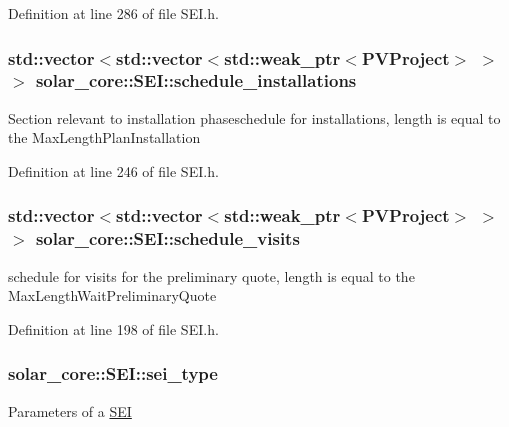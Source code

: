 Definition at line 286 of file S\+E\+I.\+h.

\hypertarget{classsolar__core_1_1_s_e_i_aacda4fae2c17d58672b60eba9c8cdc63}{}
\subsubsection[{schedule\+\_\+installations}]{\setlength{\rightskip}{0pt plus 5cm}std\+::vector$<$std\+::vector$<$std\+::weak\+\_\+ptr$<${\bf P\+V\+Project}$>$ $>$ $>$ solar\+\_\+core\+::\+S\+E\+I\+::schedule\+\_\+installations\hspace{0.3cm}{\ttfamily [protected]}}\label{classsolar__core_1_1_s_e_i_aacda4fae2c17d58672b60eba9c8cdc63}
Section relevant to installation phaseschedule for installations, length is equal to the Max\+Length\+Plan\+Installation 

Definition at line 246 of file S\+E\+I.\+h.

\hypertarget{classsolar__core_1_1_s_e_i_a8729d1aaf89da5d7d8b52761b65c881c}{}
\subsubsection[{schedule\+\_\+visits}]{\setlength{\rightskip}{0pt plus 5cm}std\+::vector$<$std\+::vector$<$std\+::weak\+\_\+ptr$<${\bf P\+V\+Project}$>$ $>$ $>$ solar\+\_\+core\+::\+S\+E\+I\+::schedule\+\_\+visits\hspace{0.3cm}{\ttfamily [protected]}}\label{classsolar__core_1_1_s_e_i_a8729d1aaf89da5d7d8b52761b65c881c}
schedule for visits for the preliminary quote, length is equal to the Max\+Length\+Wait\+Preliminary\+Quote 

Definition at line 198 of file S\+E\+I.\+h.

\hypertarget{classsolar__core_1_1_s_e_i_a788ef7ae27cee8b9b99b57eba9ab2981}{}
\subsubsection[{sei\+\_\+type}]{ solar\+\_\+core\+::\+S\+E\+I\+::sei\+\_\+type\hspace{0.3cm}{\ttfamily [protected]}}\label{classsolar__core_1_1_s_e_i_a788ef7ae27cee8b9b99b57eba9ab2981}
Parameters of a \hyperlink{classsolar__core_1_1_s_e_i}{S\+E\+I} 

